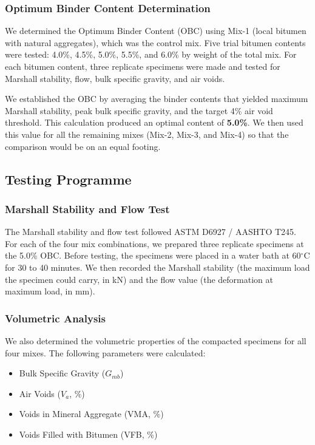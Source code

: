 \documentclass[12pt,a4paper]{article}
\begin{document}
\subsubsection{Optimum Binder Content Determination}

We determined the Optimum Binder Content (OBC) using Mix-1 (local bitumen with natural aggregates), which was the control mix. Five trial bitumen contents were tested: 4.0\%, 4.5\%, 5.0\%, 5.5\%, and 6.0\% by weight of the total mix. For each bitumen content, three replicate specimens were made and tested for Marshall stability, flow, bulk specific gravity, and air voids.

We established the OBC by averaging the binder contents that yielded maximum Marshall stability, peak bulk specific gravity, and the target 4\% air void threshold. This calculation produced an optimal content of \textbf{5.0\%}. We then used this value for all the remaining mixes (Mix-2, Mix-3, and Mix-4) so that the comparison would be on an equal footing.

\subsection{Testing Programme}

\subsubsection{Marshall Stability and Flow Test}

The Marshall stability and flow test followed ASTM D6927 / AASHTO T245. For each of the four mix combinations, we prepared three replicate specimens at the 5.0\% OBC. Before testing, the specimens were placed in a water bath at 60$^{\circ}$C for 30 to 40 minutes. We then recorded the Marshall stability (the maximum load the specimen could carry, in kN) and the flow value (the deformation at maximum load, in mm).

\subsubsection{Volumetric Analysis}

We also determined the volumetric properties of the compacted specimens for all four mixes. The following parameters were calculated:

\begin{itemize}
    \item Bulk Specific Gravity ($G_{mb}$)
    \item Air Voids ($V_a$, \%)
    \item Voids in Mineral Aggregate (VMA, \%)
    \item Voids Filled with Bitumen (VFB, \%)
\end{itemize}
\end{document}
